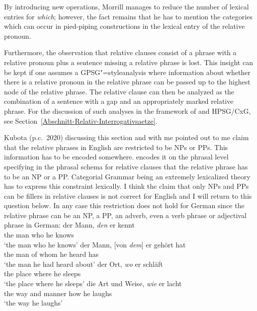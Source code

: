 By introducing new operations, Morrill manages to reduce the number of lexical entries for \emph{which}; however, the fact remains
that he has to mention the categories which can occur in pied-piping constructions in the lexical entry of the relative pronoun.

Furthermore, the observation that relative clauses consist of a phrase with a relative pronoun plus a sentence missing a relative phrase
is lost. This insight can be kept if one assumes a GPSG"=style\indexgpsg analysis where information about whether there is a relative pronoun
in the relative phrase can be passed up to the highest node of the relative phrase.
The relative clause can then be analyzed as the combination of a sentence with a gap and an appropriately marked relative phrase.
For the discussion of such analyses in the framework of \gbt and HPSG/CxG, see
Section~\ref{Abschnitt-Relativ-Interrogativsaetze}.

Kubota (p.c.\ 2020) discussing this section and \citet{Kubota2021a} with me pointed out to me
 claim that the relative phrases in English are restricted to be NPs or PPs. This information
has to be encoded somewhere. \citet[]{Sag97a} encodes it on the phrasal level specifying in the phrasal schema
for relative clauses that the relative phrase has to be an NP or a PP. Categorial Grammar being an
extremely lexicalized theory has to express this constraint lexically. I think the claim that only
NPs and PPs can be fillers in relative clauses is not correct for English and I will return to this
question below. In any case this restriction does not hold for German since the relative phrase can
be an NP, a PP, an adverb, even a verb phrase or adjectival phrase in German:
\eal
\settowidth{}
\ex 
\gll der Mann, \emph{den} er kennt\\
     the man   who he knows\\
\glt `the man who he knows'
\ex 
\gll der Mann, [von \emph{dem}] er gehört hat\\
     the man   \spacebr{}of  whom he heard has\\
\glt `the man he had heard about'
\ex 
\gll der Ort, \emph{wo} er schläft\\
     the place where he sleeps\\
\glt `the place where he sleeps'
\ex\label{ex-relative-clause-wie} 
\gll die Art und Weise, \emph{wie} er lacht\\
     the way and manner how he laughs\\
\glt `the way he laughs'

